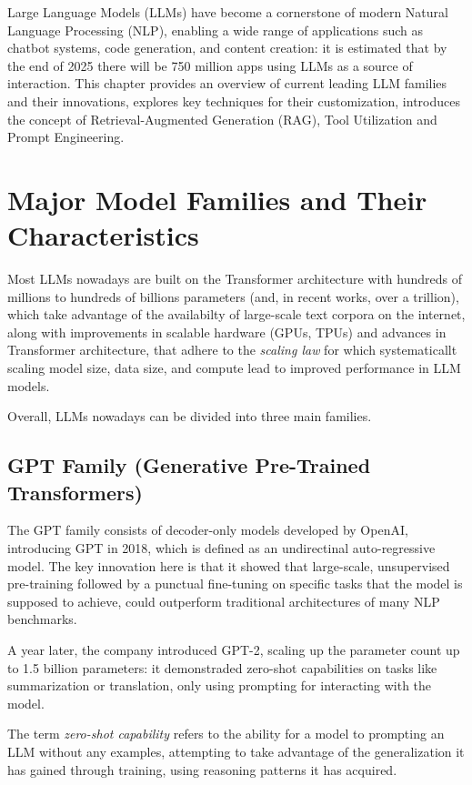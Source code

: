 Large Language Models (LLMs) have become a cornerstone of modern Natural Language Processing (NLP), enabling a wide range of applications such as chatbot systems, code generation, and content creation: it is estimated that by the end of 2025 there will be 750 million apps using LLMs as a source of interaction.\cite{uspenskyi2025} This chapter provides an overview of current leading LLM families and their innovations, explores key techniques for their customization, introduces the concept of Retrieval-Augmented Generation (RAG), Tool Utilization and Prompt Engineering.


\section{Major Model Families and Their Characteristics}
\label{sec:major-models}

Most LLMs nowadays are built on the Transformer architecture with hundreds of millions to hundreds of billions parameters (and, in recent works, over a trillion), which take advantage of the availabilty of large-scale text corpora on the internet, along with improvements in scalable hardware (GPUs, TPUs) and advances in Transformer architecture, that adhere to the \textit{scaling law}\cite{kaplan2020scaling} for which systematicallt scaling model size, data size, and compute lead to improved performance in LLM models. 

Overall, LLMs nowadays can be divided into three main families.\cite{minaee2024largelanguagemodelssurvey}


\subsection{GPT Family (Generative Pre-Trained Transformers)}

The GPT family consists of decoder-only models developed by OpenAI, introducing GPT in 2018, which is defined as an undirectinal auto-regressive model. The key innovation here is that it showed that large-scale, unsupervised pre-training followed by a punctual fine-tuning on specific tasks that the model is supposed to achieve, could outperform traditional architectures of many NLP benchmarks.

A year later, the company introduced GPT-2, scaling up the parameter count up to 1.5 billion parameters: it demonstraded zero-shot capabilities on tasks like summarization or translation, only using prompting for interacting with the model.

The term \textit{zero-shot capability} refers to the ability for a model to prompting an LLM without any examples, attempting to take advantage of the generalization it has gained through training, using reasoning patterns it has acquired.

